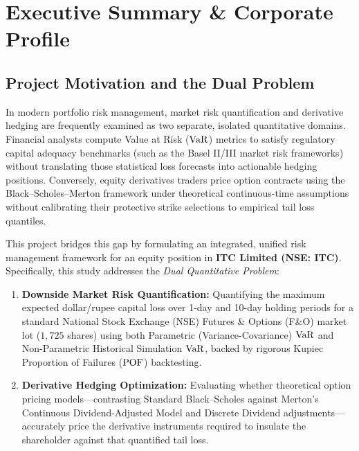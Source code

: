 
\chapter{Executive Summary \& Corporate Profile}
\label{ch:executive_summary}

\section{Project Motivation and the Dual Problem}
\label{sec:project_motivation}

In modern portfolio risk management, market risk quantification and derivative hedging are frequently examined as two separate, isolated quantitative domains. Financial analysts compute Value at Risk ($\operatorname{VaR}$) metrics to satisfy regulatory capital adequacy benchmarks (such as the Basel II/III market risk frameworks) without translating those statistical loss forecasts into actionable hedging positions. Conversely, equity derivatives traders price option contracts using the Black--Scholes--Merton framework under theoretical continuous-time assumptions without calibrating their protective strike selections to empirical tail loss quantiles.

This project bridges this gap by formulating an integrated, unified risk management framework for an equity position in \textbf{ITC Limited (NSE: ITC)}. Specifically, this study addresses the \textit{Dual Quantitative Problem}:
\begin{enumerate}[label=(\roman*)]
    \item \textbf{Downside Market Risk Quantification:} Quantifying the maximum expected dollar/rupee capital loss over 1-day and 10-day holding periods for a standard National Stock Exchange (NSE) Futures \& Options (F\&O) market lot ($1,725$ shares) using both Parametric (Variance-Covariance) $\operatorname{VaR}$ and Non-Parametric Historical Simulation $\operatorname{VaR}$, backed by rigorous Kupiec Proportion of Failures ($\operatorname{POF}$) backtesting.
    \item \textbf{Derivative Hedging Optimization:} Evaluating whether theoretical option pricing models---contrasting Standard Black--Scholes against Merton's Continuous Dividend-Adjusted Model and Discrete Dividend adjustments---accurately price the derivative instruments required to insulate the shareholder against that quantified tail loss.
\end{enumerate}

